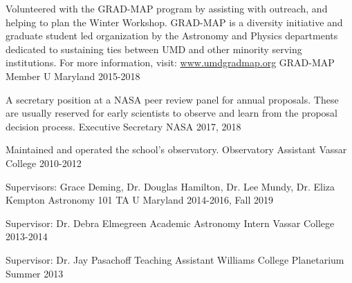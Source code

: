 \documentclass[]{awesome-cv}
\begin{document}
\begin{cventries}
	\cventry
	{Volunteered with the GRAD-MAP program by assisting with outreach, and helping to plan the Winter Workshop. GRAD-MAP is a diversity initiative and graduate student led organization by the Astronomy and Physics departments dedicated to sustaining ties between UMD and other minority serving institutions. For more information, visit: \href{https://www.umdgradmap.org/}{www.umdgradmap.org}}
	{GRAD-MAP Member}
	{U Maryland}
	{2015-2018}
	{}
	
	\vspace{-5mm}
	\cventry
	{A secretary position at a NASA peer review panel for annual proposals. These are usually reserved for early scientists to observe and learn from the proposal decision process.}
	{Executive Secretary}
	{NASA}
	{2017, 2018}
	{}
	
	\vspace{-5mm}
	\cventry
	{Maintained and operated the school's observatory.}
	{Observatory Assistant}
	{Vassar College}
	{2010-2012}
	{}
	
	\vspace{-5mm}
\end{cventries}

\begin{cventries}
	\cventry
	{Supervisors: Grace Deming, Dr. Douglas Hamilton, Dr. Lee Mundy, Dr. Eliza Kempton}
	{Astronomy 101 TA}
	{U Maryland}
	{2014-2016, Fall 2019}
	{}
	
	\vspace{-6mm}
	\cventry
	{Supervisor: Dr. Debra Elmegreen}
	{Academic Astronomy Intern}
	{Vassar College}
	{2013-2014}
	{}
	
	\vspace{-6mm}
	\cventry
	{Supervisor: Dr. Jay Pasachoff}
	{Teaching Assistant}
	{Williams College Planetarium}
	{Summer 2013}
	{}
\end{cventries}
\end{document}
